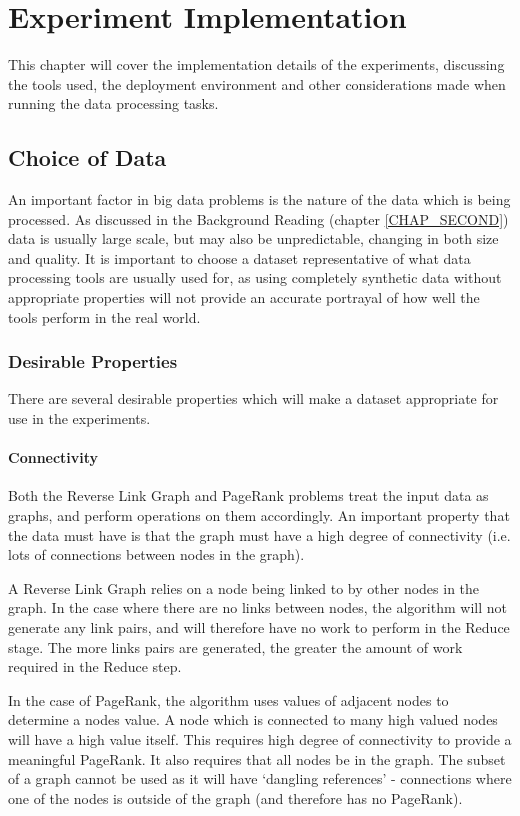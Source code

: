 \chapter{Experiment Implementation}
This chapter will cover the implementation details of the experiments, discussing the tools used, the deployment environment and other considerations made when running the data processing tasks.

\section{Choice of Data}
An important factor in big data problems is the nature of the data which is being processed. As discussed in the Background Reading (chapter \ref{CHAP_SECOND}) data is usually large scale, but may also be unpredictable, changing in both size and quality. It is important to choose a dataset representative of what data processing tools are usually used for, as using completely synthetic data without appropriate properties will not provide an accurate portrayal of how well the tools perform in the real world.

\subsection{Desirable Properties}
There are several desirable properties which will make a dataset appropriate for use in the experiments.

\subsubsection{Connectivity}
Both the Reverse Link Graph and PageRank problems treat the input data as graphs, and perform operations on them accordingly. An important property that the data must have is that the graph must have a high degree of connectivity (i.e. lots of connections between nodes in the graph). 

A Reverse Link Graph relies on a node being linked to by other nodes in the graph. In the case where there are no links between nodes, the algorithm will not generate any link pairs, and will therefore have no work to perform in the Reduce stage. The more links pairs are generated, the greater the amount of work required in the Reduce step.

In the case of PageRank, the algorithm uses values of adjacent nodes to determine a nodes value. A node which is connected to many high valued nodes will have a high value itself. This requires high degree of connectivity to provide a meaningful PageRank. It also requires that all nodes be in the graph. The subset of a graph cannot be used as it will have `dangling references' - connections where one of the nodes is outside of the graph (and therefore has no PageRank). 


